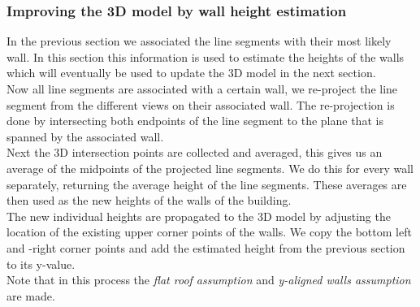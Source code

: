 \documentclass[10pt]{article}
\begin{document}
{	%



	


\subsubsection{Improving the 3D model by wall height estimation}
	In the previous section we associated the line segments with their most
	likely wall. In this section this information is used to estimate the
	heights of the walls which will eventually be used to update the 3D model in the
	next section. \\
	Now all line segments are associated with a certain wall, we re-project the
	line segment from the different views on their associated wall. The
	re-projection is done by intersecting both endpoints of the line segment to
	the plane that is spanned by the associated wall.\\
	Next the 3D intersection points are collected and averaged, this gives us
	an average of the midpoints of the projected line segments. We do this for
	every wall separately, returning the average height of the line segments.
	These averages are then used as the new heights of the walls of the
	building.\\
	The new individual heights are propagated to the 3D model by adjusting the location of the existing
	upper corner points of the walls. We copy the bottom left and -right corner
	points and add the estimated height from the previous section to its
	y-value.\\



	Note that  in this process the \emph{flat roof assumption} and
	\emph{y-aligned walls assumption} are made.






	

}
\end{document}
